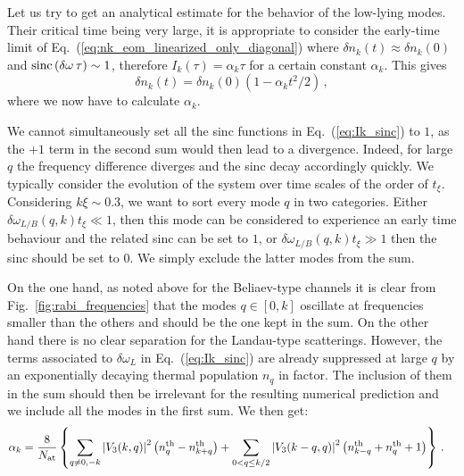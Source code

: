 \documentclass[aps,prd,notitlepage,amsfonts,amssymb,amsmath,nofootinbib,superscriptaddress,longbibliography]{revtex4-2}
\begin{document}
\begin{appendices}
Let us try to get an analytical estimate for the behavior of the low-lying modes. Their critical time being very large, it is appropriate to consider the early-time limit of Eq.~(\ref{eq:nk_eom_linearized_only_diagonal}) where $\delta n_k(t) \approx \delta n_k(0)$ and $ {\rm sinc}\left(\delta \omega \, \tau \right) \sim 1$, therefore $I_{k} \left( \tau \right) = \alpha_k \tau $ for a certain constant $\alpha_k$. This gives
\begin{equation}
\label{eq:low_k_early_times}
\delta n_k (t) = \delta n_k(0) \left(1 - \alpha_k t^2 /2 \right) \, , 
\end{equation}
where we now have to calculate $\alpha_k$. 

We cannot simultaneously set all the sinc functions in Eq.~(\ref{eq:Ik_sinc}) to $1$, as the $+1$ term in the second sum would then lead to a divergence. Indeed, for large $q$ the frequency difference diverges and the sinc decay accordingly quickly. We typically consider the evolution of the system over time scales of the order of $t_{\xi}$. Considering $k \xi \sim 0.3$, we want to sort every mode $q$ in two categories. Either $\delta \omega_{L/B} (q,k) t_{\xi} \ll 1$, then this mode can be considered to experience an early time behaviour and the related sinc can be set to $1$, or $\delta \omega_{L/B} (q,k) t_{\xi} \gg 1$ then  the sinc should be set to $0$. We simply exclude the latter modes from the sum. 

On the one hand, as noted above for the Beliaev-type channels it is clear from Fig.~\ref{fig:rabi_frequencies} that the modes $q \in \left[0 , k \right]$  oscillate at frequencies smaller than the others and should be the one kept in the sum. On the other hand there is no clear separation for the Landau-type scatterings. However, the terms associated to $\delta \omega_L$ in Eq.~(\ref{eq:Ik_sinc}) are already suppressed at large $q$ by an exponentially decaying thermal population $n_{q}$ in factor. The inclusion of them in the sum should then be irrelevant for the resulting numerical prediction and we include all the modes in the first sum. We then get:
\begin{align}
\begin{split}
\label{def:prediction_alpha_t_square}
\alpha_k & = \frac{ 8  }{N_{\rm at}} \left\{ \sum_{  q \neq 0, -k  }  \left| V_{3}(k,q) \right|^{2} \left( n_{q}^{\rm th} - n^{\rm th}_{k+q}  \right)    + \sum_{ 0 < q \leq k/2  } \left| V_{3}(k-q,q) \right|^{2} \left(n_{k-q}^{\rm th} + n_{q}^{\rm th} + 1 \right) \right\} \, . 
\end{split}
\end{align}



\end{appendices}
\end{document}

